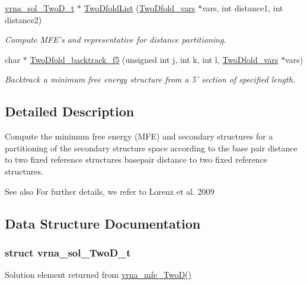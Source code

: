 \begin{DoxyCompactItemize}
\hyperlink{group__kl__neighborhood__mfe_structvrna__sol__TwoD__t}{vrna\+\_\+sol\+\_\+\+Two\+D\+\_\+t} $\ast$ \hyperlink{group__kl__neighborhood__mfe_ga7fc5e3e92fe97914ca4eccd33c01c2a7}{Two\+Dfold\+List} (\hyperlink{group__kl__neighborhood__mfe_structTwoDfold__vars}{Two\+Dfold\+\_\+vars} $\ast$vars, int distance1, int distance2)
\begin{DoxyCompactList}\small\item\em Compute M\+F\+E's and representative for distance partitioning. \end{DoxyCompactList}\item 
char $\ast$ \hyperlink{group__kl__neighborhood__mfe_gaf4dc05bf8fc1ea53acd7aeb798ba80c2}{Two\+Dfold\+\_\+backtrack\+\_\+f5} (unsigned int j, int k, int l, \hyperlink{group__kl__neighborhood__mfe_structTwoDfold__vars}{Two\+Dfold\+\_\+vars} $\ast$vars)
\begin{DoxyCompactList}\small\item\em Backtrack a minimum free energy structure from a 5' section of specified length. \end{DoxyCompactList}\end{DoxyCompactItemize}


\subsection{Detailed Description}
Compute the minimum free energy (M\+F\+E) and secondary structures for a partitioning of the secondary structure space according to the base pair distance to two fixed reference structures basepair distance to two fixed reference structures. 

\begin{DoxySeeAlso}{See also}
For further details, we refer to Lorenz et al. 2009 \cite{lorenz:2009} 
\end{DoxySeeAlso}


\subsection{Data Structure Documentation}
\label{structvrna__sol__TwoD__t}
\hypertarget{group__kl__neighborhood__mfe_structvrna__sol__TwoD__t}{}
\subsubsection{struct vrna\+\_\+sol\+\_\+\+Two\+D\+\_\+t}
Solution element returned from \hyperlink{group__kl__neighborhood__mfe_ga243c288b463147352829df04de6a2f77}{vrna\+\_\+mfe\+\_\+\+Two\+D()} 

